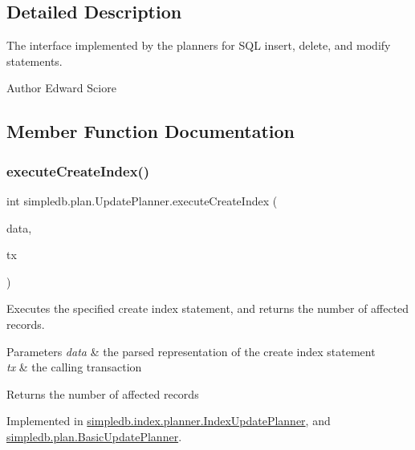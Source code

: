 \subsection{Detailed Description}
The interface implemented by the planners for S\+QL insert, delete, and modify statements. \begin{DoxyAuthor}{Author}
Edward Sciore 
\end{DoxyAuthor}


\subsection{Member Function Documentation}
\mbox{\label{interfacesimpledb_1_1plan_1_1UpdatePlanner_a62e66672add275bc79b05825186051aa}} 
\subsubsection{\texorpdfstring{execute\+Create\+Index()}{executeCreateIndex()}}
{\footnotesize\ttfamily int simpledb.\+plan.\+Update\+Planner.\+execute\+Create\+Index (\begin{DoxyParamCaption}\item[{\hyperlink{classsimpledb_1_1parse_1_1CreateIndexData}{Create\+Index\+Data}}]{data,  }\item[{\hyperlink{classsimpledb_1_1tx_1_1Transaction}{Transaction}}]{tx }\end{DoxyParamCaption})}

Executes the specified create index statement, and returns the number of affected records. 
\begin{DoxyParams}{Parameters}
{\em data} & the parsed representation of the create index statement \\
\hline
{\em tx} & the calling transaction \\
\hline
\end{DoxyParams}
\begin{DoxyReturn}{Returns}
the number of affected records 
\end{DoxyReturn}


Implemented in \hyperlink{classsimpledb_1_1index_1_1planner_1_1IndexUpdatePlanner_ad743dd19ed44d8b11338ddcd49bf861a}{simpledb.\+index.\+planner.\+Index\+Update\+Planner}, and \hyperlink{classsimpledb_1_1plan_1_1BasicUpdatePlanner_a662b9a96ae0b34c6820cf7e1c25a0577}{simpledb.\+plan.\+Basic\+Update\+Planner}.

